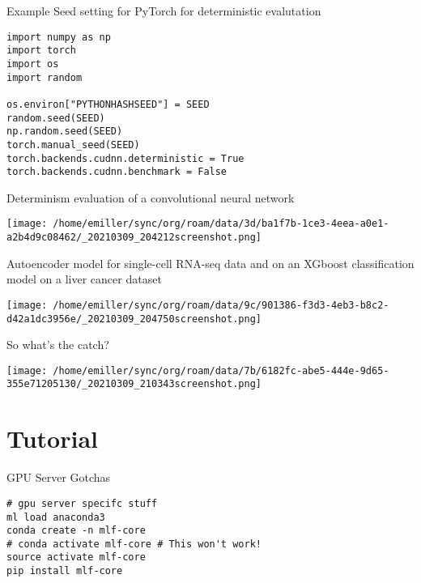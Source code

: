 \documentclass[bigger]{beamer}
\begin{document}
\begin{frame}[label={sec:org8ce56f7},fragile]{Example Seed setting for PyTorch for deterministic evalutation}
 \begin{verbatim}
import numpy as np
import torch
import os
import random

os.environ["PYTHONHASHSEED"] = SEED
random.seed(SEED)
np.random.seed(SEED)
torch.manual_seed(SEED)
torch.backends.cudnn.deterministic = True
torch.backends.cudnn.benchmark = False
\end{verbatim}
\end{frame}

\begin{frame}[label={sec:orgcee6d27}]{Determinism evaluation of a convolutional neural network}
\begin{center}
\texttt{[image: /home/emiller/sync/org/roam/data/3d/ba1f7b-1ce3-4eea-a0e1-a2b4d9c08462/\_20210309\_204212screenshot.png]}
\end{center}
\end{frame}

\begin{frame}[label={sec:org3f39b70}]{Autoencoder model for single-cell RNA-seq data and on an XGboost classification model on a liver cancer dataset}
\begin{center}
\texttt{[image: /home/emiller/sync/org/roam/data/9c/901386-f3d3-4eb3-b8c2-d42a1dc3956e/\_20210309\_204750screenshot.png]}
\end{center}
\end{frame}

\begin{frame}[label={sec:org04b7a25}]{So what's the catch?}
\begin{center}
\texttt{[image: /home/emiller/sync/org/roam/data/7b/6182fc-abe5-444e-9d65-355e71205130/\_20210309\_210343screenshot.png]}
\end{center}
\end{frame}


\section{Tutorial}
\label{sec:org56f538f}

\begin{frame}[label={sec:org99d2dc8},fragile]{GPU Server Gotchas}
 \begin{verbatim}
# gpu server specifc stuff
ml load anaconda3
conda create -n mlf-core
# conda activate mlf-core # This won't work!
source activate mlf-core
pip install mlf-core
\end{verbatim}
\end{frame}
\end{document}
